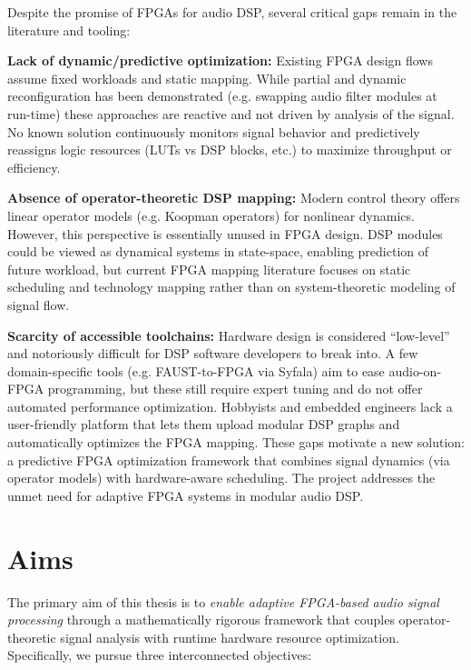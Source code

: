 Despite the promise of FPGAs for audio DSP, several critical gaps remain in the literature and tooling:
\bigskip

\noindent \textbf{Lack of dynamic/predictive optimization:} Existing FPGA design flows assume fixed workloads and static mapping. While partial and dynamic reconfiguration has been demonstrated (e.g. swapping audio filter modules at run-time) these approaches are reactive and not driven by analysis of the signal. No known solution continuously monitors signal behavior and predictively reassigns logic resources (LUTs vs DSP blocks, etc.) to maximize throughput or efficiency.
\bigskip

\noindent \textbf{Absence of operator-theoretic DSP mapping:} Modern control theory offers linear operator models (e.g. Koopman operators) for nonlinear dynamics. However, this perspective is essentially unused in FPGA design. DSP modules could be viewed as dynamical systems in state-space, enabling prediction of future workload, but current FPGA mapping literature focuses on static scheduling and technology mapping rather than on system-theoretic modeling of signal flow.
\bigskip

\noindent \textbf{Scarcity of accessible toolchains:} Hardware design is considered “low-level” and notoriously difficult for DSP software developers to break into. A few domain-specific tools (e.g. FAUST-to-FPGA via Syfala) aim to ease audio-on-FPGA programming, but these still require expert tuning and do not offer automated performance optimization. Hobbyists and embedded engineers lack a user-friendly platform that lets them upload modular DSP graphs and automatically optimizes the FPGA mapping.
These gaps motivate a new solution: a predictive FPGA optimization framework that combines signal dynamics (via operator models) with hardware-aware scheduling. The project addresses the unmet need for adaptive FPGA systems in modular audio DSP.

\section{Aims}

The primary aim of this thesis is to \emph{enable adaptive FPGA-based audio signal processing} through a mathematically rigorous framework that couples operator-theoretic signal analysis with runtime hardware resource optimization. Specifically, we pursue three interconnected objectives:

